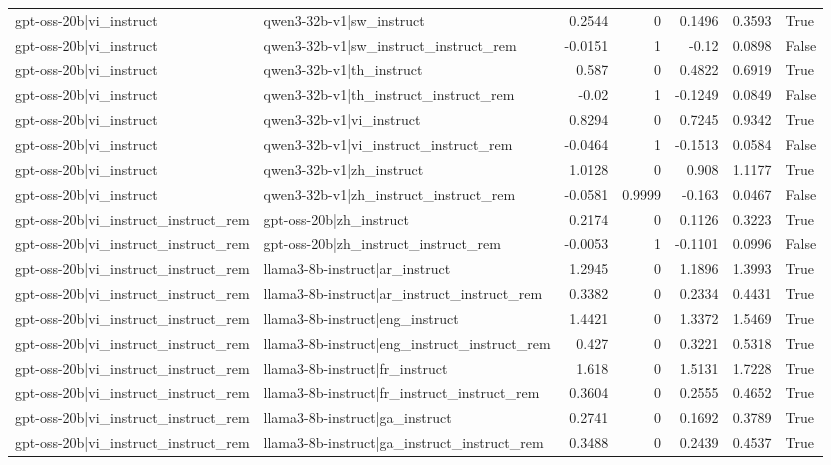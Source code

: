 \begin{table}
\begin{tabular}{l l r r r r l}
gpt-oss-20b|vi_instruct & qwen3-32b-v1|sw_instruct & 0.2544 & 0 & 0.1496 & 0.3593 & True \\
gpt-oss-20b|vi_instruct & qwen3-32b-v1|sw_instruct_instruct_rem & -0.0151 & 1 & -0.12 & 0.0898 & False \\
gpt-oss-20b|vi_instruct & qwen3-32b-v1|th_instruct & 0.587 & 0 & 0.4822 & 0.6919 & True \\
gpt-oss-20b|vi_instruct & qwen3-32b-v1|th_instruct_instruct_rem & -0.02 & 1 & -0.1249 & 0.0849 & False \\
gpt-oss-20b|vi_instruct & qwen3-32b-v1|vi_instruct & 0.8294 & 0 & 0.7245 & 0.9342 & True \\
gpt-oss-20b|vi_instruct & qwen3-32b-v1|vi_instruct_instruct_rem & -0.0464 & 1 & -0.1513 & 0.0584 & False \\
gpt-oss-20b|vi_instruct & qwen3-32b-v1|zh_instruct & 1.0128 & 0 & 0.908 & 1.1177 & True \\
gpt-oss-20b|vi_instruct & qwen3-32b-v1|zh_instruct_instruct_rem & -0.0581 & 0.9999 & -0.163 & 0.0467 & False \\
gpt-oss-20b|vi_instruct_instruct_rem & gpt-oss-20b|zh_instruct & 0.2174 & 0 & 0.1126 & 0.3223 & True \\
gpt-oss-20b|vi_instruct_instruct_rem & gpt-oss-20b|zh_instruct_instruct_rem & -0.0053 & 1 & -0.1101 & 0.0996 & False \\
gpt-oss-20b|vi_instruct_instruct_rem & llama3-8b-instruct|ar_instruct & 1.2945 & 0 & 1.1896 & 1.3993 & True \\
gpt-oss-20b|vi_instruct_instruct_rem & llama3-8b-instruct|ar_instruct_instruct_rem & 0.3382 & 0 & 0.2334 & 0.4431 & True \\
gpt-oss-20b|vi_instruct_instruct_rem & llama3-8b-instruct|eng_instruct & 1.4421 & 0 & 1.3372 & 1.5469 & True \\
gpt-oss-20b|vi_instruct_instruct_rem & llama3-8b-instruct|eng_instruct_instruct_rem & 0.427 & 0 & 0.3221 & 0.5318 & True \\
gpt-oss-20b|vi_instruct_instruct_rem & llama3-8b-instruct|fr_instruct & 1.618 & 0 & 1.5131 & 1.7228 & True \\
gpt-oss-20b|vi_instruct_instruct_rem & llama3-8b-instruct|fr_instruct_instruct_rem & 0.3604 & 0 & 0.2555 & 0.4652 & True \\
gpt-oss-20b|vi_instruct_instruct_rem & llama3-8b-instruct|ga_instruct & 0.2741 & 0 & 0.1692 & 0.3789 & True \\
gpt-oss-20b|vi_instruct_instruct_rem & llama3-8b-instruct|ga_instruct_instruct_rem & 0.3488 & 0 & 0.2439 & 0.4537 & True \\

\end{tabular}
\end{table}
